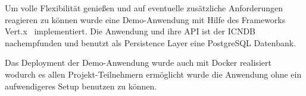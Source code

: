 Um volle Flexibilit\"at genie\ss{}en und auf eventuelle zus\"atzliche Anforderungen reagieren zu k\"onnen wurde eine Demo-Anwendung mit Hilfe des Frameworks Vert.x~\cite{Vertx:online} implementiert.
Die Anwendung und ihre API ist der ICNDB~\cite{ICNDB:online} nachempfunden und benutzt als Persistence Layer eine PostgreSQL Datenbank.

Das Deployment der Demo-Anwendung wurde auch mit Docker realisiert wodurch es allen Projekt-Teilnehmern erm\"oglicht wurde die Anwendung ohne ein aufwendigeres Setup benutzen zu k\"onnen.

